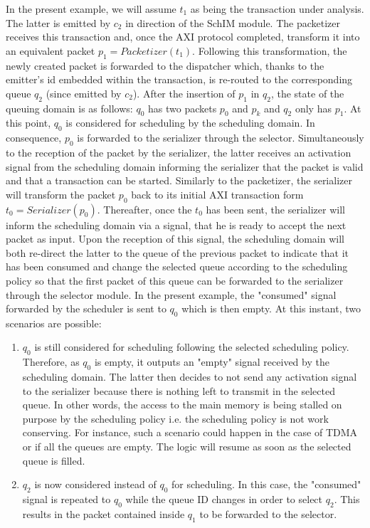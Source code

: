         In the present example, we will assume $t_{1}$ as being the transaction under analysis.
        The latter is emitted by $c_{2}$ in direction of the SchIM module.
        The packetizer receives this transaction and, once the AXI protocol completed, transform it into an equivalent packet $p_{1} = Packetizer(t_{1})$.
        Following this transformation, the newly created packet is forwarded to the dispatcher which, thanks to the emitter's id embedded within the transaction, is re-routed to the corresponding queue $q_{2}$ (since emitted by $c_{2}$).
        After the insertion of $p_{1}$ in $q_{2}$, the state of the queuing domain is as follows: $q_{0}$ has two packets $p_{0}$ and $p_{k}$ and $q_{2}$ only has $p_{1}$.
        At this point, $q_{0}$ is considered for scheduling by the scheduling domain.
        In consequence, $p_{0}$ is forwarded to the serializer through the selector.
        Simultaneously to the reception of the packet by the serializer, the latter receives an activation signal from the scheduling domain informing the serializer that the packet is valid and that a transaction can be started.
        Similarly to the packetizer, the serializer will transform the packet $p_{0}$ back to its initial AXI transaction form $t_{0} = Serializer(p_{0})$.
        Thereafter, once the $t_{0}$ has been sent, the serializer will inform the scheduling domain via a signal, that he is ready to accept the next packet as input.
        Upon the reception of this signal, the scheduling domain will both re-direct the latter to the queue of the previous packet to indicate that it has been consumed and change the selected queue according to the scheduling policy so that the first packet of this queue can be forwarded to the serializer through the selector module.
        In the present example, the "consumed" signal forwarded by the scheduler is sent to $q_{0}$ which is then empty.
        At this instant, two scenarios are possible:
        \begin{enumerate}
            \item $q_{0}$ is still considered for scheduling following the selected scheduling policy. Therefore, as $q_{0}$ is empty, it outputs an "empty" signal received by the scheduling domain.
                  The latter then decides to not send any activation signal to the serializer because there is nothing left to transmit in the selected queue.
                  In other words, the access to the main memory is being stalled on purpose by the scheduling policy i.e. the scheduling policy is not work conserving.
                  For instance, such a scenario could happen in the case of TDMA or if all the queues are empty.
                  The logic will resume as soon as the selected queue is filled.
            \item $q_{2}$ is now considered instead of $q_{0}$ for scheduling.
                  In this case, the "consumed" signal is repeated to $q_{0}$ while the queue ID changes in order to select $q_{2}$.
                  This results in the packet contained inside $q_{1}$ to be forwarded to the selector.
        \end{enumerate}
